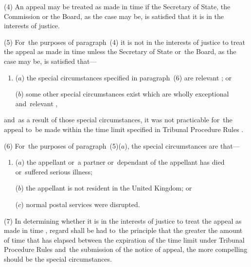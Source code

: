 \documentclass[12pt,a4paper]{article}
\begin{document}
(4) An appeal may be treated as made in time if the Secretary of State, the Commission or the Board, as the case may be, is satisfied that it is in the interests of justice.

(5) For~the purposes of paragraph~(4) it is not in the interests of justice to 
treat the appeal as made in time unless   %
the Secretary of State or~the Board, as the case may be,  %
is satisfied that—
\begin{enumerate}\item[]
($a$) the special circumstances specified in paragraph~(6) are relevant%
; or

($b$) some other special circumstances exist which are wholly exceptional and~relevant%
,
\end{enumerate}
and~as a result of those special circumstances, it was not practicable for~the 
appeal to~be made  %
within the time limit specified in 
Tribunal Procedure Rules%
.

(6) For~the purposes of paragraph~(5)($a$), the special circumstances are that—
\begin{enumerate}\item[]
($a$) the 
appellant  %
or~a 
partner  %
or~dependant of the 
appellant  %
has died or~suffered serious illness;

($b$) the 
appellant  %
is not resident in the United Kingdom; or

($c$) normal postal services were disrupted.
\end{enumerate}

(7) In determining whether it is in the interests of justice to 
treat the appeal as made in time%
, 
regard shall be had  %
to~the principle that the greater the amount of time that has elapsed between the expiration of the time 
limit under Tribunal Procedure Rules and~the submission of the notice of appeal, the more compelling should be the special circumstances.  %
\end{document}
